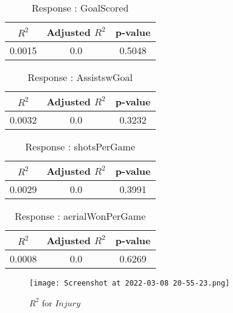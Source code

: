 \documentclass[12pt]{article}
\begin{document}
\begin{minipage}{0.5\textwidth}
		\begin{table}[H]
		\centering
		\caption{Response : GoalScored}\label{table:1a}
		{\begin{tabular}{|c|c|c|}
				\hline
				$ R^2 $ & Adjusted $ R^2 $ & p-value \\
				\hline
				0.0015 & 0.0 & 0.5048 \\
				\hline
			\end{tabular}
		}
	\end{table}
	\begin{table}[H]
		\centering
		\caption{Response : AssistswGoal}\label{table:1a}
		{\begin{tabular}{|c|c|c|}
				\hline
				$ R^2 $ & Adjusted $ R^2 $ & p-value \\
				\hline
				0.0032 & 0.0 & 0.3232 \\
				\hline
			\end{tabular}
		}
	\end{table}
	
\end{minipage}
\hfill
\begin{minipage}{0.5\textwidth}
		\begin{table}[H]
		\centering
		\caption{Response : shotsPerGame }\label{table:1a}
		{\begin{tabular}{|c|c|c|}
				\hline
				$ R^2 $ & Adjusted $ R^2 $ & p-value \\
				\hline
				0.0029 & 0.0 & 0.3991 \\
				\hline
			\end{tabular}
		}
	\end{table}
	\begin{table}[H]
		\centering
		\caption{Response : aerialWonPerGame}\label{table:1a}
		{\begin{tabular}{|c|c|c|}
				\hline
				$ R^2 $ & Adjusted $ R^2 $ & p-value \\
				\hline
				0.0008 & 0.0 & 0.6269 \\
				\hline
			\end{tabular}
		}
	\end{table}
	
\end{minipage}

\begin{figure}[H]
	\centering
	\texttt{[image: Screenshot at 2022-03-08 20-55-23.png]}
	\caption{$ R^2 $ for $ Injury $}
	\label{fig:1}
\end{figure}
\end{document}
